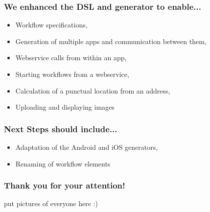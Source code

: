 \begin{frame}[t]
    \frametitle{We enhanced the DSL and generator to enable...}
    
    \begin{itemize}
    	\item Workflow specifications,
    	\item Generation of multiple apps and communication between them,
    	\item Webservice calls from within an app,
    	\item Starting workflows from a webservice,
    	\item Calculation of a punctual location from an address,
    	\item Uploading and displaying images
    \end{itemize}

\end{frame}

\begin{frame}[t]
    \frametitle{Next Steps should include...}

	\begin{itemize}
		\item Adaptation of the Android and iOS generators,
		\item Renaming of workflow elements
	\end{itemize}
\end{frame}

\begin{frame}
\frametitle{Thank you for your attention!}

put pictures of everyone here :)
\end{frame}
